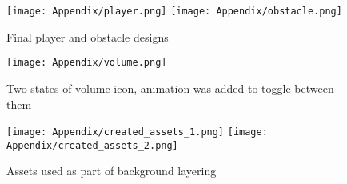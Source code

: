 \documentclass[oneside,a4paper,11pt]{report}
\begin{document}
\begin{figure}[!htb]
	\centering
	\texttt{[image: Appendix/player.png]}
	\texttt{[image: Appendix/obstacle.png]}
	\caption{Final player and obstacle designs}
\end{figure}

\begin{figure}
	\centering
	\texttt{[image: Appendix/volume.png]}
	\caption{Two states of volume icon, animation was added to toggle between them}
\end{figure}

\begin{figure}
	\centering
	\texttt{[image: Appendix/created\_assets\_1.png]}
	\texttt{[image: Appendix/created\_assets\_2.png]}
	\caption{Assets used as part of background layering}
\end{figure}
\end{document}
